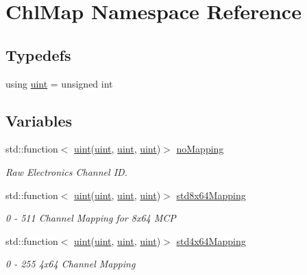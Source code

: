 \hypertarget{namespace_chl_map}{}\section{Chl\+Map Namespace Reference}
\label{namespace_chl_map}
\subsection*{Typedefs}
\begin{DoxyCompactItemize}
\item 
using \hyperlink{namespace_chl_map_a7ef435046de5fb240ed873ae9fe91254}{uint} = unsigned int
\end{DoxyCompactItemize}
\subsection*{Variables}
\begin{DoxyCompactItemize}
\item 
std\+::function$<$ \hyperlink{namespace_chl_map_a7ef435046de5fb240ed873ae9fe91254}{uint}(\hyperlink{namespace_chl_map_a7ef435046de5fb240ed873ae9fe91254}{uint}, \hyperlink{namespace_chl_map_a7ef435046de5fb240ed873ae9fe91254}{uint}, \hyperlink{namespace_chl_map_a7ef435046de5fb240ed873ae9fe91254}{uint})$>$ \hyperlink{namespace_chl_map_a737b285621b10b9c3980dc18b8ba1b18}{no\+Mapping}
\begin{DoxyCompactList}\small\item\em Raw Electronics Channel ID. \end{DoxyCompactList}\item 
std\+::function$<$ \hyperlink{namespace_chl_map_a7ef435046de5fb240ed873ae9fe91254}{uint}(\hyperlink{namespace_chl_map_a7ef435046de5fb240ed873ae9fe91254}{uint}, \hyperlink{namespace_chl_map_a7ef435046de5fb240ed873ae9fe91254}{uint}, \hyperlink{namespace_chl_map_a7ef435046de5fb240ed873ae9fe91254}{uint})$>$ \hyperlink{namespace_chl_map_a1c25ae4d560fda9abe7fb0684c6ceae7}{std8x64\+Mapping}
\begin{DoxyCompactList}\small\item\em 0 -\/ 511 Channel Mapping for 8x64 M\+CP \end{DoxyCompactList}\item 
std\+::function$<$ \hyperlink{namespace_chl_map_a7ef435046de5fb240ed873ae9fe91254}{uint}(\hyperlink{namespace_chl_map_a7ef435046de5fb240ed873ae9fe91254}{uint}, \hyperlink{namespace_chl_map_a7ef435046de5fb240ed873ae9fe91254}{uint}, \hyperlink{namespace_chl_map_a7ef435046de5fb240ed873ae9fe91254}{uint})$>$ \hyperlink{namespace_chl_map_a0c1a33254dc47f2250f48c234f6f91f7}{std4x64\+Mapping}
\begin{DoxyCompactList}\small\item\em 0 -\/ 255 4x64 Channel Mapping \end{DoxyCompactList}\end{DoxyCompactItemize}


